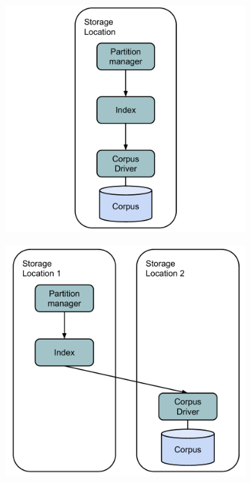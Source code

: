 \begin{figure}[H]
  \begin{subfigure}{0.24\textwidth}
    \includegraphics[width=\linewidth]{./figures/evaluation/ycsb_freshness_local.pdf}
    \caption{}
    \label{fig:ycsb_freshness_local}
  \end{subfigure}%
  \hspace*{\fill}
  \begin{subfigure}{0.24\textwidth}
    \includegraphics[width=\linewidth]{./figures/evaluation/ycsb_freshness_remote_corpus.pdf}

\end{subfigure}
\end{figure}
